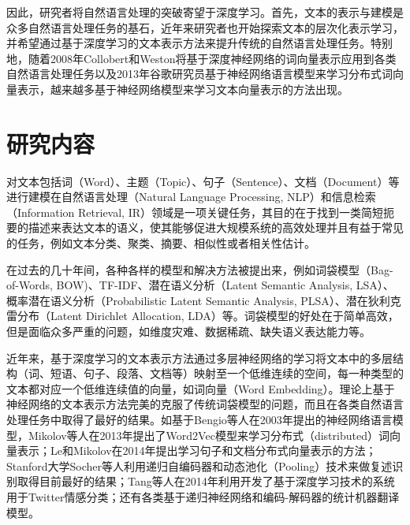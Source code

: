 \documentclass[master]{njuthesis}
\begin{document}
因此，研究者将自然语言处理的突破寄望于深度学习。首先，文本的表示与建模是众多自然语言处理任务的基石，近年来研究者也开始探索文本的层次化表示学习，并希望通过基于深度学习的文本表示方法来提升传统的自然语言处理任务。特别地，随着2008年Collobert和Weston将基于深度神经网络的词向量表示应用到各类自然语言处理任务\cite{collobert2008unified}以及2013年谷歌研究员基于神经网络语言模型来学习分布式词向量表示\cite{mikolov2013efficient}，越来越多基于神经网络模型来学习文本向量表示的方法出现。

\section{研究内容}\label{sec_chap1_motivations}

对文本包括词（Word）、主题（Topic）、句子（Sentence）、文档（Document）等进行建模在自然语言处理（Natural Language Processing, NLP）和信息检索（Information Retrieval, IR）领域是一项关键任务，其目的在于找到一类简短扼要的描述来表达文本的语义，使其能够促进大规模系统的高效处理并且有益于常见的任务，例如文本分类、聚类、摘要、相似性或者相关性估计。

在过去的几十年间，各种各样的模型和解决方法被提出来，例如词袋模型（Bag-of-Words, BOW)\cite{zhang2010understanding}、TF-IDF\cite{salton1986introduction}、潜在语义分析（Latent Semantic Analysis, LSA）\cite{landauer1998introduction}、概率潜在语义分析（Probabilistic Latent Semantic Analysis, PLSA）\cite{hofmann1999probabilistic}、潜在狄利克雷分布（Latent Dirichlet Allocation, LDA）\cite{blei2003latent}等。词袋模型的好处在于简单高效，但是面临众多严重的问题，如维度灾难、数据稀疏、缺失语义表达能力等。

近年来，基于深度学习的文本表示方法通过多层神经网络的学习将文本中的多层结构（词、短语、句子、段落、文档等）映射至一个低维连续的空间，每一种类型的文本都对应一个低维连续值的向量，如词向量（Word Embedding）。理论上基于神经网络的文本表示方法完美的克服了传统词袋模型的问题，而且在各类自然语言处理任务中取得了最好的结果\cite{collobert2008unified}。如基于Bengio等人在2003年提出的神经网络语言模型\cite{bengio2003neural}，Mikolov等人在2013年提出了Word2Vec模型来学习分布式（distributed）词向量表示\cite{mikolov2013efficient,mikolov2013distributed,mikolov2013linguistic}；Le和Mikolov在2014年提出学习句子和文档分布式向量表示的方法\cite{le2014distributed}；Stanford大学Socher等人利用递归自编码器和动态池化（Pooling）技术来做复述识别取得目前最好的结果\cite{socher2011dynamic}；Tang等人在2014年利用开发了基于深度学习技术的系统用于Twitter情感分类\cite{tang2014coooolll}；还有各类基于递归神经网络和编码-解码器的统计机器翻译模型\cite{bahdanau2014neural,cho2014learning}。
\end{document}
